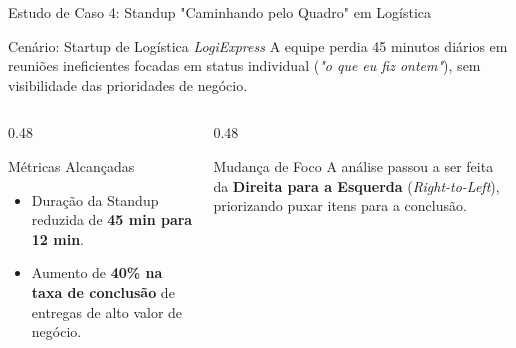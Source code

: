 \documentclass[aspectratio=169, 9pt]{beamer}
\begin{document}
\begin{frame}{Estudo de Caso 4: Standup "Caminhando pelo Quadro" em Logística}
  \begin{block}{Cenário: Startup de Logística \textit{LogiExpress}}
    A equipe perdia 45 minutos diários em reuniões ineficientes focadas em status individual (\textit{"o que eu fiz ontem"}), sem visibilidade das prioridades de negócio.
  \end{block}

  \vspace{0.1cm}

  \begin{center}
  \end{center}

  \vspace{-0.1cm}

  \begin{columns}[T]
    \begin{column}{0.48\textwidth}
      \begin{exampleblock}{Métricas Alcançadas}
        \begin{itemize}
          \item Duração da Standup reduzida de \textbf{45 min para 12 min}.
          \item Aumento de \textbf{40\% na taxa de conclusão} de entregas de alto valor de negócio.
        \end{itemize}
      \end{exampleblock}
    \end{column}

    \begin{column}{0.48\textwidth}
      \begin{alertblock}{Mudança de Foco}
        A análise passou a ser feita da \textbf{Direita para a Esquerda} (\textit{Right-to-Left}), priorizando puxar itens para a conclusão.
      \end{alertblock}
    \end{column}
  \end{columns}
\end{frame}
\end{document}
